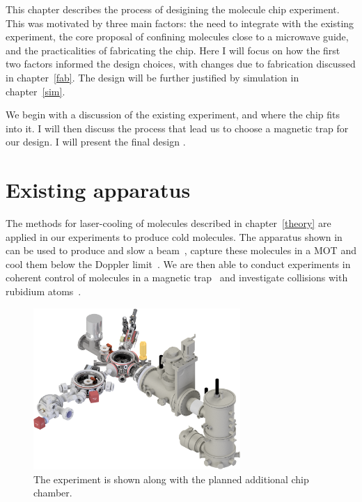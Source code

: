 This chapter describes the process of desigining the molecule chip experiment.
This was motivated by three main factors: the need to integrate with the
existing experiment, the core proposal of confining molecules close to a
microwave guide, and the practicalities of fabricating the chip. Here I will
focus on how the first two factors informed the design choices, with changes
due to fabrication discussed in chapter~\ref{fab}. The design will be further
justified by simulation in chapter~\ref{sim}.

We begin with a discussion of
the existing experiment, and where the chip fits into it. I will then discuss
the process that lead us to choose a magnetic trap for our design. I will
present the final design . 

\section{Existing \CaF{} apparatus}


The methods for laser-cooling of molecules described in
chapter~\ref{theory} are applied in our experiments to produce cold \CaF{}
molecules. The apparatus shown in  can be
used to produce and slow a \CaF{} beam~\cite{PhysRevA.89.053416, Truppe2017a}, capture these
molecules in a MOT and cool them below the Doppler limit~\cite{Truppe2017}. We
are then able to conduct experiments in coherent control of molecules in a
magnetic trap~\cite{PhysRevLett.124.063001} and investigate collisions with
rubidium atoms~\cite{PhysRevLett.126.153401, Jurgilas2021}.

\begin{figure}[htb]
  \centering
  \includegraphics[width=0.7\textwidth]{figs/overview/apparatus_04_crp.png}
  \caption{
    The \CaF{} experiment is shown along with the planned additional chip
    chamber.}
  \label{overview:fig:vacuumsystem}
\end{figure}

